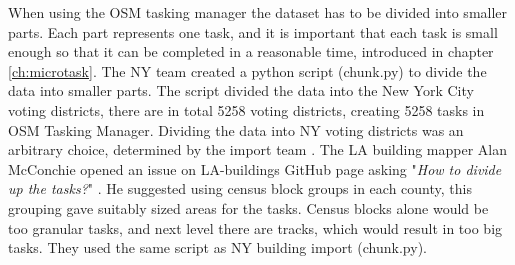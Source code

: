 When using the OSM tasking manager the dataset has to be divided into smaller parts. Each part represents one task, and it is important that each task is small enough so that it can be completed in a reasonable time, introduced in chapter \ref{ch:microtask}. The NY team created a python script (chunk.py) to divide the data into smaller parts. The script divided the data into the New York City voting districts, there are in total 5258 voting districts, creating 5258 tasks in OSM Tasking Manager. Dividing the data into NY voting districts was an arbitrary choice, determined by the import team \cite{Barth2014}. The LA building mapper Alan McConchie opened an issue on LA-buildings GitHub page asking "\textit{How to divide up the tasks?}" \cite{McConchie2014}. He suggested using census block groups in each county, this grouping gave suitably sized areas for the tasks. Census blocks alone would be too granular tasks, and next level there are tracks, which would result in too big tasks. They used the same script as NY building import (chunk.py). 
